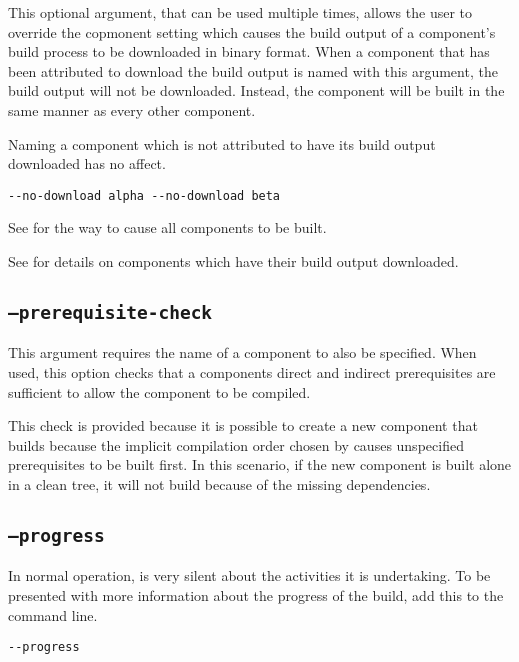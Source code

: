 This optional argument, that can be used multiple times, allows the
user to override the copmonent setting which causes the build output
of a component's build process to be downloaded in binary format.
When a component that has been attributed to download the build output
is named with this argument, the build output will not be downloaded.
Instead, the component will be built in the same manner as every other
component.

Naming a component which is not attributed to have its build output
downloaded has no affect.

\begin{verbatim}
--no-download alpha --no-download beta
\end{verbatim}

See  for the way to
cause all components to be built.

See  for details on components
which have their build output downloaded.

\subsection{\texttt{--prerequisite-check}}\label{usinglmsbw:prerequisite-check}

This argument requires the name of a component to also be specified.
When used, this option checks that a components direct and indirect
prerequisites are sufficient to allow the component to be compiled.

This check is provided because it is possible to create a new
component that builds because the implicit compilation order chosen by
\make causes unspecified prerequisites to be built first.  In this
scenario, if the new component is built alone in a clean tree, it will
not build because of the missing dependencies.

\subsection{\texttt{--progress}}\label{usinglmsbw:progress}

In normal operation, \lmsbw is very silent about the activities it is
undertaking.  To be presented with more information about the progress
of the build, add this to the command line.

\begin{verbatim}
--progress
\end{verbatim}

